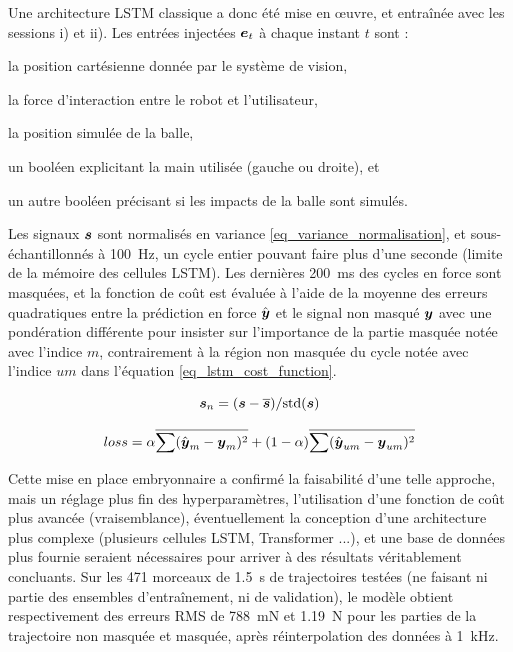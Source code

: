 Une architecture LSTM classique a donc été mise en œuvre, et entraînée avec les sessions i) et ii). Les entrées injectées $\vect{e}_t$ à chaque instant $t$ sont : 
\begin{enumerate*}[label=\alph*)]
	\item la position cartésienne donnée par le système de vision,
	\item la force d'interaction entre le robot et l'utilisateur,
	\item la position simulée de la balle,
	\item un booléen explicitant la main utilisée (gauche ou droite), et
	\item un autre booléen précisant si les impacts de la balle sont simulés.
\end{enumerate*}
Les signaux $\vect{s}$ sont normalisés en variance \cref{eq_variance_normalisation}, et sous-échantillonnés à \SI{100}{\hertz}, un cycle entier pouvant faire plus d'une seconde (limite de la mémoire des cellules LSTM). Les dernières \SI{200}{\milli\second} des cycles en force sont masquées, et la fonction de coût est évaluée à l'aide de la moyenne des erreurs quadratiques entre la prédiction en force $\hat{\vect{y}}$ et le signal non masqué $\vect{y}$ avec une pondération différente pour insister sur l'importance de la partie masquée notée avec l'indice $m$, contrairement à la région non masquée du cycle notée avec l'indice $um$ dans l'équation \cref{eq_lstm_cost_function}.

\begin{equation} \label{eq_variance_normalisation}
	\vect{s}_n = (\vect{s} - \mean{\vect{s}})/\text{std}(\vect{s})
\end{equation}

\begin{equation} \label{eq_lstm_cost_function}
	loss = \alpha \mean{\sum(\hat{\vect{y}}_m - \vect{y}_m)^2} + (1-\alpha) \mean{\sum(\hat{\vect{y}}_{um} - \vect{y}_{um})^2}
\end{equation}

Cette mise en place embryonnaire a confirmé la faisabilité d'une telle approche, mais un réglage plus fin des hyperparamètres, l'utilisation d'une fonction de coût plus avancée (vraisemblance), éventuellement la conception d'une architecture plus complexe (plusieurs cellules LSTM, Transformer \parencite{vaswani_attention_2017}...), et une base de données plus fournie seraient nécessaires pour arriver à des résultats véritablement concluants. Sur les 471 morceaux de \SI{1.5}{\second} de trajectoires testées (ne faisant ni partie des ensembles d'entraînement, ni de validation), le modèle obtient respectivement des erreurs RMS de \SI{788}{\milli\newton} et \SI{1.19}{\newton} pour les parties de la trajectoire non masquée et masquée, après réinterpolation des données à \SI{1}{\kilo\hertz}.

